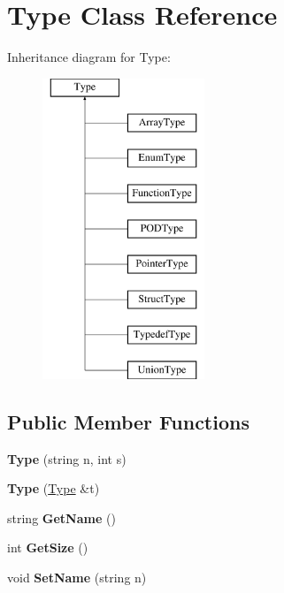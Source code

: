 \hypertarget{classType}{\section{Type Class Reference}
\label{classType}
}
Inheritance diagram for Type\-:\begin{figure}[H]
\begin{center}
\leavevmode
\includegraphics[height=9.000000cm]{classType}
\end{center}
\end{figure}
\subsection*{Public Member Functions}
\begin{DoxyCompactItemize}
\item 
\hypertarget{classType_a0ec88e19865012d53e20b97677218783}{{\bfseries Type} (string n, int s)}\label{classType_a0ec88e19865012d53e20b97677218783}

\item 
\hypertarget{classType_a617481e51492ea14507c83d5dba2cce5}{{\bfseries Type} (\hyperlink{classType}{Type} \&t)}\label{classType_a617481e51492ea14507c83d5dba2cce5}

\item 
\hypertarget{classType_a8143fe4686ae1a5709a5955396c6ee26}{string {\bfseries Get\-Name} ()}\label{classType_a8143fe4686ae1a5709a5955396c6ee26}

\item 
\hypertarget{classType_afe0fca035825759785b525d2a24f69fe}{int {\bfseries Get\-Size} ()}\label{classType_afe0fca035825759785b525d2a24f69fe}

\item 
\hypertarget{classType_ab8d2328a3a76289edf42b9bf0d4f278f}{void {\bfseries Set\-Name} (string n)}\label{classType_ab8d2328a3a76289edf42b9bf0d4f278f}

\end{DoxyCompactItemize}
